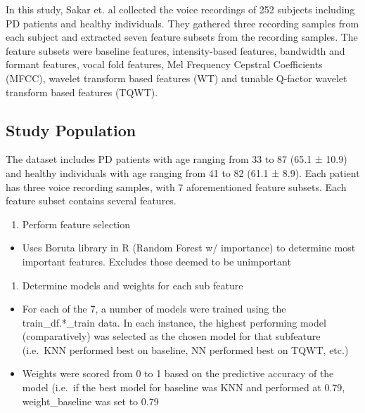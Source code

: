 \documentclass[
]{article}
\providecommand{\tightlist}{%
  \setlength{\itemsep}{0pt}\setlength{\parskip}{0pt}}
\begin{document}
In this study, Sakar et. al collected the voice recordings of 252 subjects including PD patients and healthy individuals. They gathered three recording samples from each subject and extracted seven feature subsets from the recording samples. The feature subsets were baseline features, intensity-based features, bandwidth and formant features, vocal fold features, Mel Frequency Cepstral Coefficients (MFCC), wavelet transform based features (WT) and tunable Q-factor wavelet transform based features (TQWT).

\hypertarget{study-population}{%
\subsection{Study Population}\label{study-population}}

The dataset includes PD patients with age ranging from 33 to 87 (65.1 ± 10.9) and healthy individuals with age
ranging from 41 to 82 (61.1 ± 8.9). Each patient has three voice recording samples, with 7 aforementioned
feature subsets. Each feature subset contains several features.

\begin{enumerate}
\def\labelenumi{\arabic{enumi}.}
\setcounter{enumi}{2}
\tightlist
\item
  Perform feature selection
\end{enumerate}

\begin{itemize}
\tightlist
\item
  Uses Boruta library in R (Random Forest w/ importance) to determine most important features. Excludes those deemed to be unimportant
\end{itemize}

\begin{enumerate}
\def\labelenumi{\arabic{enumi}.}
\setcounter{enumi}{3}
\tightlist
\item
  Determine models and weights for each sub feature
\end{enumerate}

\begin{itemize}
\tightlist
\item
  For each of the 7, a number of models were trained using the train\_df.*\_train data. In each instance, the highest performing model (comparatively) was selected as the chosen model for that subfeature (i.e.~KNN performed best on baseline, NN performed best on TQWT, etc.)
\item
  Weights were scored from 0 to 1 based on the predictive accuracy of the model (i.e.~if the best model for baseline was KNN and performed at 0.79, weight\_baseline was set to 0.79
\end{itemize}
\end{document}
